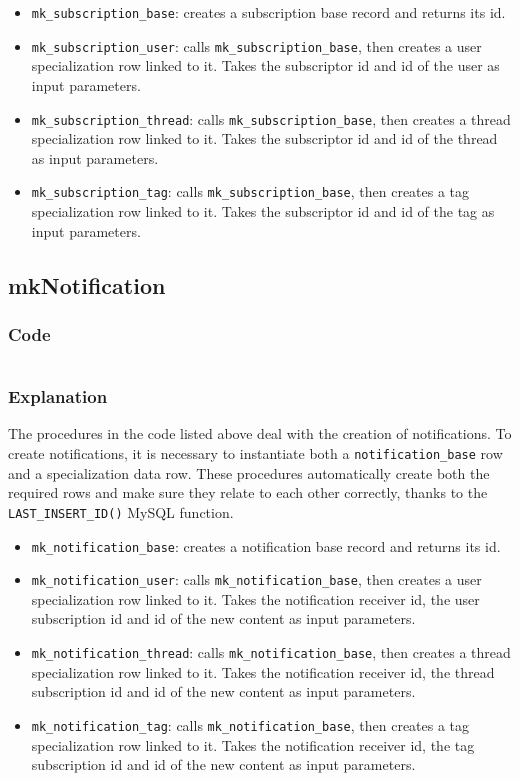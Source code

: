 \documentclass[12pt]{report}
\newcommand{\printSQLtest}[1]
{
    \inputminted[linenos, breaklines, breakbytoken, tabsize=4, fontsize=\footnotesize]{mysql}{#1}
}
\newcommand{\printSQLTablepage}[2]
{
    \newpage
    \subsection{#2}
    \subsubsection{Code}
    \printSQLtest{../sql/parts/#1}
    \subsubsection{Explanation}
}
\begin{document}
                    \begin{itemize}
                        \item \texttt{mk_subscription_base}: creates a subscription base record and returns its id.
                         \item \texttt{mk_subscription_user}: calls \texttt{mk_subscription_base}, then creates a user specialization row linked to it.
                        Takes the subscriptor id and id of the user as input parameters.
                        \item \texttt{mk_subscription_thread}: calls \texttt{mk_subscription_base}, then creates a thread specialization row linked to it.
                        Takes the subscriptor id and id of the thread as input parameters.
                        \item \texttt{mk_subscription_tag}: calls \texttt{mk_subscription_base}, then creates a tag specialization row linked to it.
                        Takes the subscriptor id and id of the tag as input parameters.
                    \end{itemize}


                \printSQLTablepage{23_procsMkNotification.sql}{mkNotification}
                     The procedures in the code listed above deal with the creation of notifications. To create notifications, it is necessary to instantiate both a \texttt{notification_base} row and a specialization data row.
                    These procedures automatically create both the required rows and make sure they relate to each other correctly, thanks to the \texttt{LAST_INSERT_ID()} MySQL function.

                    \begin{itemize}
                        \item \texttt{mk_notification_base}: creates a notification base record and returns its id.
                         \item \texttt{mk_notification_user}: calls \texttt{mk_notification_base}, then creates a user specialization row linked to it.
                        Takes the notification receiver id, the user subscription id and id of the new content as input parameters.
                        \item \texttt{mk_notification_thread}: calls \texttt{mk_notification_base}, then creates a thread specialization row linked to it.
                        Takes the notification receiver id, the thread subscription id and id of the new content as input parameters.
                        \item \texttt{mk_notification_tag}: calls \texttt{mk_notification_base}, then creates a tag specialization row linked to it.
                        Takes the notification receiver id, the tag subscription id and id of the new content as input parameters.
                    \end{itemize}
\end{document}

